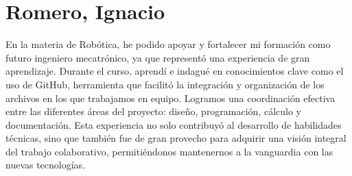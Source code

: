 \section{Romero, Ignacio}
En la materia de Robótica, he podido apoyar y fortalecer mi formación como futuro ingeniero mecatrónico, ya que representó una experiencia de gran aprendizaje. Durante el curso, aprendí e indagué en conocimientos clave como el uso de GitHub, herramienta que facilitó la integración y organización de los archivos en los que trabajamos en equipo. Logramos una coordinación efectiva entre las diferentes áreas del proyecto: diseño, programación, cálculo y documentación. Esta experiencia no solo contribuyó al desarrollo de habilidades técnicas, sino que también fue de gran provecho para adquirir una visión integral del trabajo colaborativo, permitiéndonos mantenernos a la vanguardia con las nuevas tecnologías.